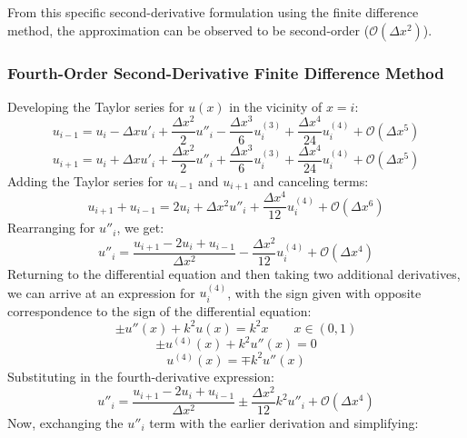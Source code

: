 \documentclass[10pt, reqno]{article}		%
\numberwithin{equation}{section}
\begin{document}
From this specific second-derivative formulation using the finite difference method, the approximation can be observed to be second-order ($\mathcal{O}(\Delta x^2)$).

\subsubsection{Fourth-Order Second-Derivative Finite Difference Method}

Developing the Taylor series for $u(x)$ in the vicinity of $x = i$:
\begin{equation}
u_{i-1} = u_i - \Delta x u'_i + \frac{\Delta x^2}{2} u''_i - \frac{\Delta x^3}{6} u^{(3)}_i + \frac{\Delta x^4}{24} u^{(4)}_i + \mathcal{O}(\Delta x^5)
\end{equation}
\begin{equation}
u_{i+1} = u_i + \Delta x u'_i + \frac{\Delta x^2}{2} u''_i + \frac{\Delta x^3}{6} u^{(3)}_i + \frac{\Delta x^4}{24} u^{(4)}_i + \mathcal{O}(\Delta x^5)
\end{equation}
Adding the Taylor series for $u_{i-1}$ and $u_{i+1}$ and canceling terms:
\begin{equation}
u_{i+1} + u_{i-1} = 2u_i + \Delta x^2 u''_i + \frac{\Delta x^4}{12} u^{(4)}_i + \mathcal{O}(\Delta x^6)
\end{equation}
Rearranging for $u''_i$, we get:
\begin{equation}
u''_i = \frac{u_{i+1} -2u_i + u_{i-1}}{\Delta x^2} - \frac{\Delta x^2}{12} u^{(4)}_i + \mathcal{O}(\Delta x^4)
\end{equation}
Returning to the differential equation and then taking two additional derivatives, we can arrive at an expression for $u^{(4)}_i$, with the sign given with opposite correspondence to the sign of the differential equation:
\begin{equation}
\pm u''(x)+k^2u(x)=k^2x \qquad x \in (0, 1)
\end{equation}
\begin{equation}
\pm u^{(4)}(x)+k^2u''(x)=0
\end{equation}
\begin{equation}
u^{(4)}(x) = \mp k^2u''(x)
\end{equation}
Substituting in the fourth-derivative expression:
\begin{equation}
u''_i = \frac{u_{i+1} -2u_i + u_{i-1}}{\Delta x^2} \pm \frac{\Delta x^2}{12} k^2u''_i + \mathcal{O}(\Delta x^4)
\end{equation}
Now, exchanging the $u''_i$ term with the earlier derivation and simplifying:
\end{document}
